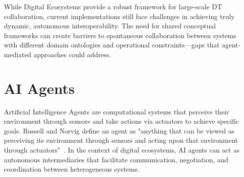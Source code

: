 

While Digital Ecosystems provide a robust framework for large-scale DT collaboration,
    current implementations still face challenges in achieving truly dynamic, autonomous interoperability.
The need for shared conceptual frameworks
    can create barriers to spontaneous collaboration between systems with different
    domain ontologies and operational constraints—gaps that agent-mediated approaches could address.

\section{AI Agents}

Artificial Intelligence Agents are computational systems that perceive their environment through
    sensors and take actions via actuators to achieve specific goals.
Russell and Norvig define an agent as
    "anything that can be viewed as perceiving its environment through sensors and acting upon that environment through actuators"~\cite{Russell_2020}.
In the context of digital ecosystems, AI agents can act as autonomous intermediaries that
    facilitate communication, negotiation, and coordination between heterogeneous systems.

